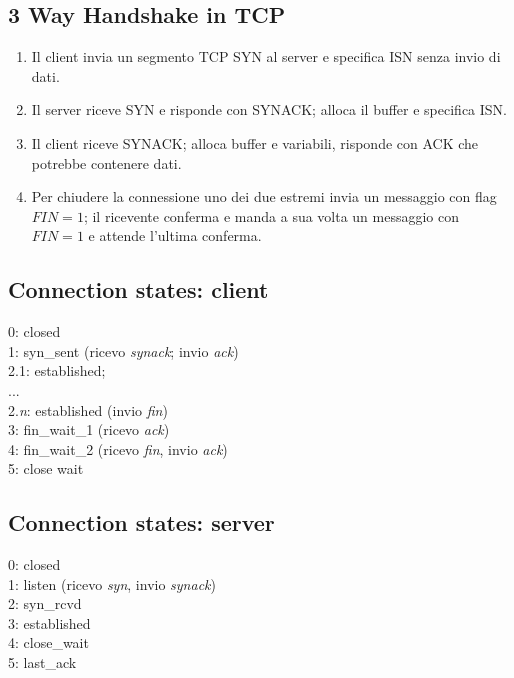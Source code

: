 \subsection{3 Way Handshake in TCP}
\begin{enumerate}
	\item Il client invia un segmento TCP SYN al server e specifica ISN senza invio di dati.
	\item Il server riceve SYN e risponde con SYNACK; alloca il buffer e specifica ISN.
	\item Il client riceve SYNACK; alloca buffer e variabili, risponde con ACK che potrebbe contenere dati.
	\item Per chiudere la connessione uno dei due estremi invia un messaggio con flag $ FIN=1 $; il ricevente conferma e manda a sua volta un messaggio con $ FIN=1 $ e attende l'ultima conferma.
\end{enumerate}
\newpage

\subsection{Connection states: client}
0: closed\\
1: syn\_sent		(ricevo \textit{synack}; invio \textit{ack})\\
2.1: established;\\
$...$\\
2.\textit{n}: established		(invio \textit{fin})\\
3: fin\_wait\_1		(ricevo \textit{ack})\\
4: fin\_wait\_2		(ricevo \textit{fin}, invio \textit{ack})\\
5: close wait\\

\subsection{Connection states: server}
0: closed\\
1: listen			(ricevo \textit{syn}, invio \textit{synack})\\
2: syn\_rcvd\\
3: established\\
4: close\_wait\\
5: last\_ack\\

